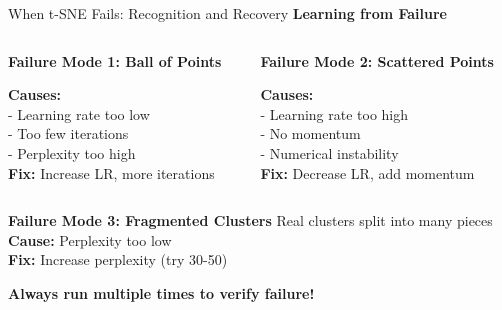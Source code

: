 \documentclass[10pt]{beamer}
\newcommand{\emphtext}[1]{\textcolor{upcblue}{\textbf{#1}}}
\newcommand{\warningbox}[1]{\colorbox{red!10}{\begin{minipage}{0.85\textwidth}\centering #1\end{minipage}}}
\begin{document}
\begin{frame}{When t-SNE Fails: Recognition and Recovery}
\emphtext{Learning from Failure}

\vspace{0.3cm}
\begin{columns}[T]
\begin{column}{0.48\textwidth}
\textbf{Failure Mode 1: Ball of Points}

\footnotesize
\textbf{Causes:}\\
- Learning rate too low\\
- Too few iterations\\
- Perplexity too high\\
\textbf{Fix:} Increase LR, more iterations
\end{column}

\begin{column}{0.48\textwidth}
\textbf{Failure Mode 2: Scattered Points}

\footnotesize
\textbf{Causes:}\\
- Learning rate too high\\
- No momentum\\
- Numerical instability\\
\textbf{Fix:} Decrease LR, add momentum
\end{column}
\end{columns}

\vspace{0.3cm}
\textbf{Failure Mode 3: Fragmented Clusters}
\footnotesize
Real clusters split into many pieces\\
\textbf{Cause:} Perplexity too low\\
\textbf{Fix:} Increase perplexity (try 30-50)

\begin{center}
\warningbox{\footnotesize\textbf{Always run multiple times to verify failure!}}
\end{center}
\end{frame}
\end{document}
